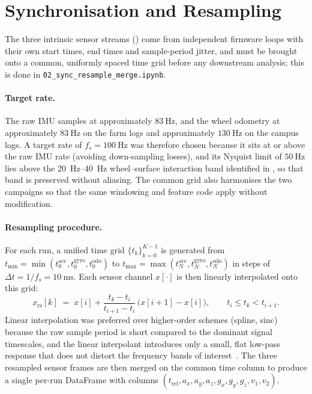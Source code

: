 \vspace{-4mm}
\section{Synchronisation and Resampling}
\label{sec:sync_resample}

The three intrinsic sensor streams () come from independent firmware loops with their own start times, end times and sample-period jitter, and must be brought onto a common, uniformly spaced time grid before any downstream analysis; this is done in \texttt{02\_sync\_resample\_merge.ipynb}.

\paragraph{Target rate.}
The raw IMU samples at approximately $\SI{83}{\hertz}$, and the wheel odometry at approximately $\SI{83}{\hertz}$ on the farm logs and approximately $\SI{130}{\hertz}$ on the campus logs. A target rate of $f_s = \SI{100}{\hertz}$ was therefore chosen because it sits at or above the raw IMU rate (avoiding down-sampling losses), and its Nyquist limit of $\SI{50}{\hertz}$ lies above the \SIrange{20}{40}{\hertz} wheel--surface interaction band identified in , so that band is preserved without aliasing. The common grid also harmonises the two campaigns so that the same windowing and feature code apply without modification.

\paragraph{Resampling procedure.}
For each run, a unified time grid $\{t_k\}_{k=0}^{K-1}$ is generated from $t_{\min} = \min(t_0^{\mathrm{acc}}, t_0^{\mathrm{gyro}}, t_0^{\mathrm{odo}})$ to $t_{\max} = \max(t_N^{\mathrm{acc}}, t_N^{\mathrm{gyro}}, t_N^{\mathrm{odo}})$ in steps of $\Delta t = 1/f_s = \SI{10}{\milli\second}$. Each sensor channel $x[\cdot]$ is then linearly interpolated onto this grid:
\begin{equation}
    x_{\mathrm{rs}}[k]
    \;=\;
    x[i] + \frac{t_k - t_i}{t_{i+1} - t_i}\,\bigl(x[i+1] - x[i]\bigr),
    \qquad
    t_i \le t_k < t_{i+1}.
    \label{eq:linear_interp}
\end{equation}
Linear interpolation was preferred over higher-order schemes (spline, sinc) because the raw sample period is short compared to the dominant signal timescales, and the linear interpolant introduces only a small, flat low-pass response that does not distort the frequency bands of interest~\cite{Press2007}. The three resampled sensor frames are then merged on the common time column to produce a single per-run DataFrame with columns $(t_{\mathrm{rel}}, a_x, a_y, a_z,\allowbreak g_x, g_y, g_z, v_1, v_2)$.

